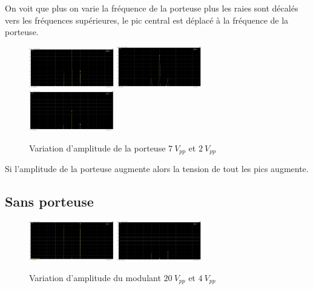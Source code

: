 \documentclass[11pt, openright]{book}
\begin{document}
On voit que plus on varie la fréquence de la porteuse plus les raies sont décalés vers les fréquences supérieures, le pic central est déplacé à la fréquence de la porteuse.

\begin{figure}[ht!]
    \centering
    \includegraphics[width=0.33\textwidth]{./object/g13.png}
    \includegraphics[width=0.33\textwidth]{./object/g6.png}
    \includegraphics[width=0.33\textwidth]{./object/g14.png}
    \caption{Variation d'amplitude de la porteuse $7\ V_{pp}$ et $2\ V_{pp}$}
\end{figure}

Si l'amplitude de la porteuse augmente alors la tension de tout les pics augmente.

\newpage

\subsection{Sans porteuse}
\begin{figure}[ht]
    \centering
    \includegraphics[width=0.33\textwidth]{./object/g15.png}
    \includegraphics[width=0.33\textwidth]{./object/g16.png}
    \caption{Variation d'amplitude du modulant $20\ V_{pp}$ et $4\ V_{pp}$}
\end{figure}
\end{document}
